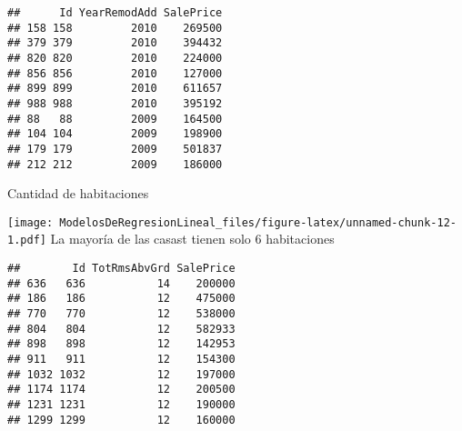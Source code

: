\documentclass[
]{article}
\newenvironment{Shaded}{\begin{snugshade}}{\end{snugshade}}
\newcommand{\AttributeTok}[1]{\textcolor[rgb]{0.77,0.63,0.00}{#1}}
\newcommand{\DecValTok}[1]{\textcolor[rgb]{0.00,0.00,0.81}{#1}}
\newcommand{\FunctionTok}[1]{\textcolor[rgb]{0.00,0.00,0.00}{#1}}
\newcommand{\NormalTok}[1]{#1}
\newcommand{\OtherTok}[1]{\textcolor[rgb]{0.56,0.35,0.01}{#1}}
\newcommand{\SpecialCharTok}[1]{\textcolor[rgb]{0.00,0.00,0.00}{#1}}
\newcommand{\StringTok}[1]{\textcolor[rgb]{0.31,0.60,0.02}{#1}}
\begin{document}
\begin{verbatim}
##      Id YearRemodAdd SalePrice
## 158 158         2010    269500
## 379 379         2010    394432
## 820 820         2010    224000
## 856 856         2010    127000
## 899 899         2010    611657
## 988 988         2010    395192
## 88   88         2009    164500
## 104 104         2009    198900
## 179 179         2009    501837
## 212 212         2009    186000
\end{verbatim}

Cantidad de habitaciones

\begin{Shaded}
\end{Shaded}

\texttt{[image: ModelosDeRegresionLineal\_files/figure-latex/unnamed-chunk-12-1.pdf]}
La mayoría de las casast tienen solo 6 habitaciones

\begin{Shaded}
\end{Shaded}

\begin{verbatim}
##        Id TotRmsAbvGrd SalePrice
## 636   636           14    200000
## 186   186           12    475000
## 770   770           12    538000
## 804   804           12    582933
## 898   898           12    142953
## 911   911           12    154300
## 1032 1032           12    197000
## 1174 1174           12    200500
## 1231 1231           12    190000
## 1299 1299           12    160000
\end{verbatim}
\end{document}
